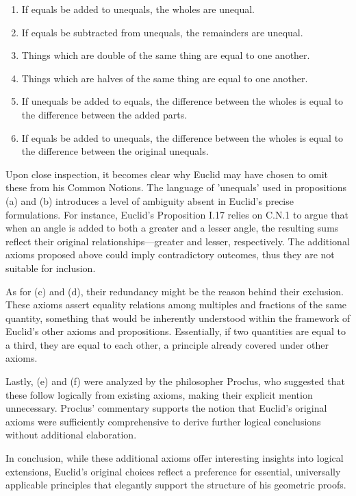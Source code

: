 \begin{enumerate}[label=\alph*]
\item If equals be added to unequals, the wholes are unequal.
\item If equals be subtracted from unequals, the remainders are unequal.
\item Things which are double of the same thing are equal to one another.
\item Things which are halves of the same thing are equal to one another.
\item If unequals be added to equals, the difference between the wholes is equal to the difference between the added parts.
\item If equals be added to unequals, the difference between the wholes is equal to the difference between the original unequals.
\end{enumerate}

Upon close inspection, it becomes clear why Euclid may have chosen to omit these from his Common Notions. The language of 'unequals' used in propositions (a) and (b) introduces a level of ambiguity absent in Euclid's precise formulations. For instance, Euclid’s Proposition I.17 relies on C.N.1 to argue that when an angle is added to both a greater and a lesser angle, the resulting sums reflect their original relationships—greater and lesser, respectively. The additional axioms proposed above could imply contradictory outcomes, thus they are not suitable for inclusion.

As for (c) and (d), their redundancy might be the reason behind their exclusion. These axioms assert equality relations among multiples and fractions of the same quantity, something that would be inherently understood within the framework of Euclid's other axioms and propositions. Essentially, if two quantities are equal to a third, they are equal to each other, a principle already covered under other axioms.

Lastly, (e) and (f) were analyzed by the philosopher Proclus, who suggested that these follow logically from existing axioms, making their explicit mention unnecessary. Proclus' commentary supports the notion that Euclid's original axioms were sufficiently comprehensive to derive further logical conclusions without additional elaboration.

In conclusion, while these additional axioms offer interesting insights into logical extensions, Euclid's original choices reflect a preference for essential, universally applicable principles that elegantly support the structure of his geometric proofs.

\clearpage
